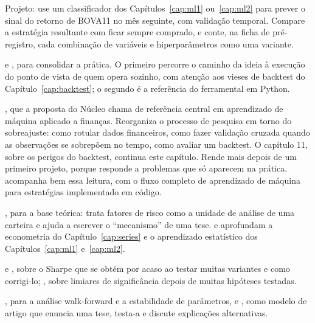 \begin{exercicios}
  \item {} Projeto: use um classificador dos Capítulos~\ref{cap:ml1} ou~\ref{cap:ml2} para prever o sinal do retorno de BOVA11 no mês seguinte, com validação temporal. Compare a estratégia resultante com ficar sempre comprado, e conte, na ficha de pré-registro, cada combinação de variáveis e hiperparâmetros como uma variante.
\end{exercicios}

\begin{leituras}
  \item \citet{chan2021} e \citet{hilpisch2018}, para consolidar a prática. O primeiro percorre o caminho da ideia à execução do ponto de vista de quem opera sozinho, com atenção aos vieses de backtest do Capítulo~\ref{cap:backtest}; o segundo é a referência do ferramental em Python.
  \item \citet{lopezdeprado2018}, que a proposta do Núcleo chama de referência central em aprendizado de máquina aplicado a finanças. Reorganiza o processo de pesquisa em torno do sobreajuste: como rotular dados financeiros, como fazer validação cruzada quando as observações se sobrepõem no tempo, como avaliar um backtest. O capítulo 11, sobre os perigos do backtest, continua este capítulo. Rende mais depois de um primeiro projeto, porque responde a problemas que só aparecem na prática. \citet{jansen2020} acompanha bem essa leitura, com o fluxo completo de aprendizado de máquina para estratégias implementado em código.
  \item \citet{ang2014}, para a base teórica: trata fatores de risco como a unidade de análise de uma carteira e ajuda a escrever o ``mecanismo'' de uma tese. \citet{tsay2010} e \citet{hastie2009} aprofundam a econometria do Capítulo~\ref{cap:series} e o aprendizado estatístico dos Capítulos~\ref{cap:ml1} e~\ref{cap:ml2}.
  \item \citet{bailey2014pseudo} e \citet{bailey2014dsr}, sobre o Sharpe que se obtém por acaso ao testar muitas variantes e como corrigi-lo; \citet{harvey2016}, sobre limiares de significância depois de muitas hipóteses testadas.
  \item \citet{pardo2008}, para a análise walk-forward e a estabilidade de parâmetros, e \citet{jegadeesh1993}, como modelo de artigo que enuncia uma tese, testa-a e discute explicações alternativas.
\end{leituras}
